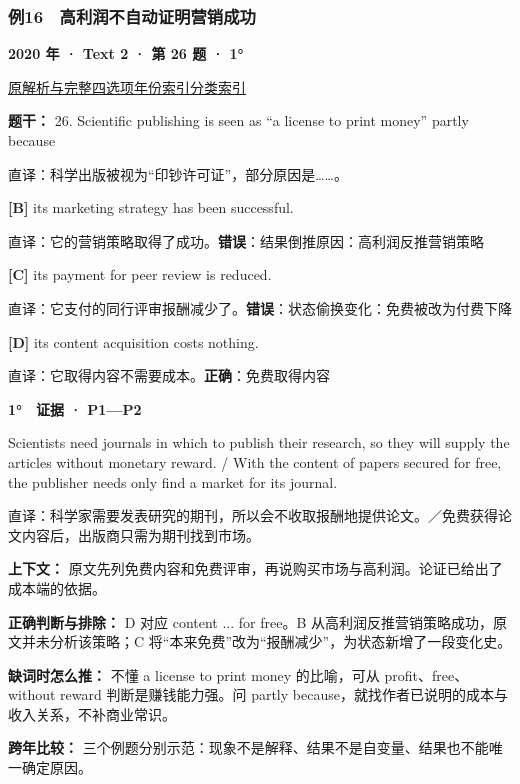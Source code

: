 \documentclass[11pt,a4paper]{article}
\begin{document}
\subsubsection{例16　高利润不自动证明营销成功}\label{case-2020-T2-Q26}
\noindent\textbf{2020 年 · Text 2 · 第 26 题 · 1°}\par\noindent \href{https://zj139.github.io/math-notes/english/6e15b3011263b94671dc7411/\#q26}{原解析与完整四选项}\quad \hyperref[idx-2020-T2-Q26]{年份索引}\quad \hyperref[class-R07]{分类索引}\par\smallskip
\noindent\textbf{题干：} 26. Scientific publishing is seen as “a license to print money” partly because\par\smallskip
直译：科学出版被视为“印钞许可证”，部分原因是……。

\noindent\textbf{[B]} its marketing strategy has been successful.\par\nopagebreak
\noindent 直译：它的营销策略取得了成功。\quad\textbf{错误}：结果倒推原因：高利润反推营销策略\par\smallskip
{}\noindent\textbf{[C]} its payment for peer review is reduced.\par\nopagebreak
\noindent 直译：它支付的同行评审报酬减少了。\quad\textbf{错误}：状态偷换变化：免费被改为付费下降\par\smallskip
{}\noindent\textbf{[D]} its content acquisition costs nothing.\par\nopagebreak
\noindent 直译：它取得内容不需要成本。\quad\textbf{正确}：免费取得内容\par\smallskip
\begin{evidence}\textbf{1°　证据 · P1—P2}\par Scientists need journals in which to publish their research, so they will supply the articles without monetary reward. / With the content of papers secured for free, the publisher needs only find a market for its journal.\par 直译：科学家需要发表研究的期刊，所以会不收取报酬地提供论文。／免费获得论文内容后，出版商只需为期刊找到市场。\end{evidence}
\noindent\textbf{上下文：} 原文先列免费内容和免费评审，再说购买市场与高利润。论证已给出了成本端的依据。\par\smallskip
\noindent\textbf{正确判断与排除：} D 对应 content ... for free。B 从高利润反推营销策略成功，原文并未分析该策略；C 将“本来免费”改为“报酬减少”，为状态新增了一段变化史。\par\smallskip
\noindent\textbf{缺词时怎么推：} 不懂 a license to print money 的比喻，可从 profit、free、without reward 判断是赚钱能力强。问 partly because，就找作者已说明的成本与收入关系，不补商业常识。\par\smallskip
\noindent\textbf{跨年比较：} 三个例题分别示范：现象不是解释、结果不是自变量、结果也不能唯一确定原因。\par\smallskip
\clearpage
\end{document}
